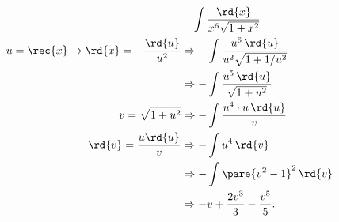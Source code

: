 \documentclass{ctexart}
\begin{document}
\begin{align*}
    &\phantom{\Rightarrow} \int \frac{\rd{x}}{x^6\sqrt{1+x^2}} \\
    u = \rec{x} \rightarrow \rd{x} = -\frac{\rd{u}}{u^2} &\Rightarrow -\int \frac{u^6\,\rd{u}}{u^2\sqrt{1+1/u^2}} \\
    &\Rightarrow -\int \frac{u^5\,\rd{u}}{\sqrt{1+u^2}} \\
    v = \sqrt{1+u^2} &\Rightarrow -\int \frac{u^4 \cdot u\,\rd{u}}{v} \\
    \rd{v} = \frac{u \rd{u}}{v} &\Rightarrow -\int u^4\,\rd{v} \\
    &\Rightarrow -\int \pare{v^2-1}^2\,\rd{v} \\
    &\Rightarrow -v + \frac{2 v^3}{3} - \frac{v^5}{5}.
\end{align*}
\end{document}
